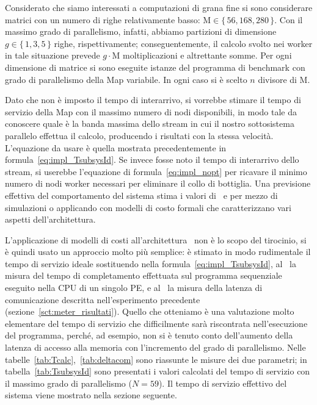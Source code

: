 Considerato che siamo interessati a computazioni di grana fine si sono considerare matrici con un numero di righe relativamente basso: $\mathrm{M} \in \{\,56, 168, 280\,\}$. Con il massimo grado di parallelismo, infatti, abbiamo partizioni di dimensione $g \in \{\,1, 3, 5\,\}$ righe, rispettivamente; conseguentemente, il calcolo svolto nei worker in tale situazione prevede $g\cdot\mathrm{M}$ moltiplicazioni e altrettante somme. Per ogni dimensione di matrice si sono eseguite istanze del programma di benchmark con grado di parallelismo della Map variabile. In ogni caso si \`e scelto $n$ divisore di $\mathrm{M}$.

Dato che non \`e imposto il tempo di interarrivo, si vorrebbe stimare il tempo di servizio della Map con il massimo numero di nodi disponibili, in modo tale da conoscere quale \`e la banda massima dello stream in cui il nostro sottosistema parallelo effettua il calcolo, producendo i risultati con la stessa velocit\`a. 
L'equazione da usare \`e quella mostrata precedentemente in formula~\ref{eq:impl_TsubsysId}. Se invece fosse noto il tempo di interarrivo dello stream, si userebbe l'equazione di formula~\ref{eq:impl_nopt} per ricavare il minimo numero di nodi worker necessari per eliminare il collo di bottiglia. Una previsione effettiva del comportamento del sistema stima i valori di \Tcalc\ e \deltacom per mezzo di simulazioni o applicando con modelli di costo formali che caratterizzano vari aspetti dell'architettura.

L'applicazione di modelli di costi all'architettura \tile\ non \`e lo scopo del tirocinio, si \`e quindi usato un approccio molto pi\`u semplice: \`e stimato in modo rudimentale il tempo di servizio ideale sostituendo nella formula~\ref{eq:impl_TsubsysId}, al  \Tcalc\ la misura del tempo di completamento effettuata sul programma sequenziale eseguito nella CPU di un singolo PE, e al \deltacom\ la misura della latenza di comunicazione descritta nell'esperimento precedente (sezione~\ref{sct:meter_risultati}).
Quello che otteniamo \`e una valutazione molto elementare del tempo di servizio che difficilmente sar\`a riscontrata nell'esecuzione del programma, perch\'e, ad esempio, non si \`e tenuto conto dell'aumento della latenza di accesso alla memoria con l'incremento del grado di parallelismo.
Nelle tabelle~\ref{tab:Tcalc},~\ref{tab:deltacom} sono riassunte le misure dei due parametri; in tabella~\ref{tab:TsubsysId} sono presentati i valori calcolati del tempo di servizio con il massimo grado di parallelismo ($N=59$). Il tempo di servizio effettivo del sistema viene mostrato nella sezione seguente.

